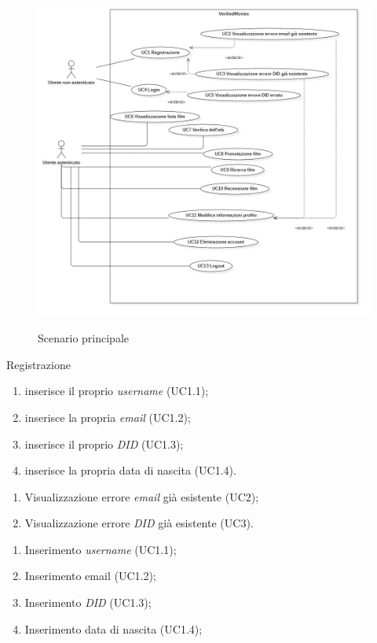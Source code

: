 \begin{figure}[!ht] 
    \centering 
    \includegraphics[width=0.9\columnwidth, alt={Scenario principale dei vari casi d'uso individuati}]{immagini/usecase/scenario-principale.jpg}
    \caption{Scenario principale}\label{fig:usecase-scenario-principale}
\end{figure}

\begin{usecase}{1}{Registrazione}\label{uc:registrazione}

\begin{enumerate}
  \item inserisce il proprio \textit{username} (UC1.1);
  \item inserisce la propria \textit{email} (UC1.2);
  \item inserisce il proprio \textit{DID} (UC1.3);
  \item inserisce la propria data di nascita (UC1.4).
\end{enumerate}

\usecaseext{}
\begin{enumerate}
  \item Visualizzazione errore \textit{email} già esistente (UC2);
  \item Visualizzazione errore \textit{DID} già esistente (UC3).
\end{enumerate}

\begin{enumerate}
  \item Inserimento \textit{username} (UC1.1);
  \item Inserimento email (UC1.2);
  \item Inserimento \textit{DID} (UC1.3);
  \item Inserimento data di nascita (UC1.4);
\end{enumerate}
\end{usecase}

